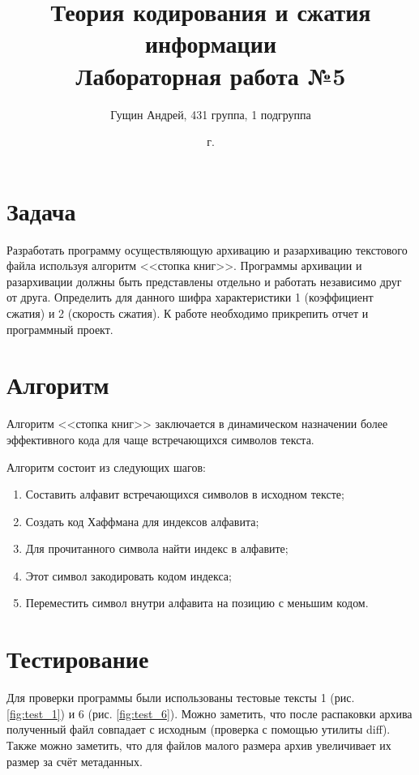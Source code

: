 \documentclass[a4paper,oneside]{article}
\title{{Теория кодирования и сжатия информации}\\{Лабораторная работа №5}}
\author{Гущин Андрей, 431 группа, 1 подгруппа}
\date{\the\year{} г.}
\theoremstyle{definition}
\begin{document}
\maketitle

\section{Задача}

Разработать программу осуществляющую архивацию и разархивацию текстового файла
используя алгоритм <<стопка книг>>. Программы архивации и разархивации должны
быть представлены отдельно и работать независимо друг от друга. Определить для
данного шифра характеристики 1 (коэффициент сжатия) и 2 (скорость сжатия). К
работе необходимо прикрепить отчет и программный проект.


\section{Алгоритм}

Алгоритм <<стопка книг>> заключается в динамическом назначении более эффективного
кода для чаще встречающихся символов текста.

Алгоритм состоит из следующих шагов:
\begin{enumerate}
  \item Составить алфавит встречающихся символов в исходном тексте;
  \item Создать код Хаффмана для индексов алфавита;
  \item Для прочитанного символа найти индекс в алфавите;
  \item Этот символ закодировать кодом индекса;
  \item Переместить символ внутри алфавита на позицию с меньшим кодом.
\end{enumerate}


\section{Тестирование}

Для проверки программы были использованы тестовые тексты 1 (рис.
\ref{fig:test_1}) и 6 (рис. \ref{fig:test_6}). Можно заметить,
что после распаковки архива полученный файл совпадает с исходным (проверка
с помощью утилиты diff). Также можно заметить, что для файлов малого размера
архив увеличивает их размер за счёт метаданных.
\end{document}
